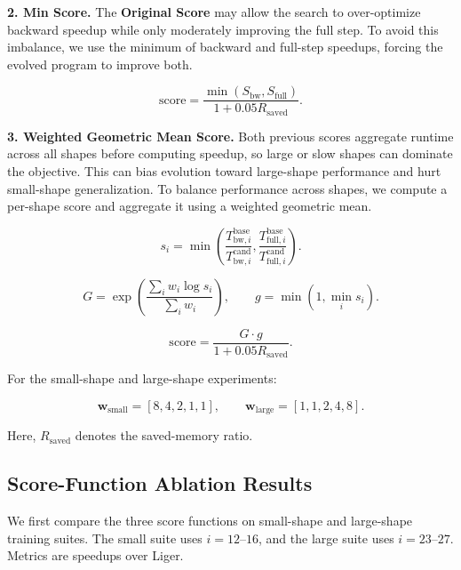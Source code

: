 \documentclass[11pt]{article}
\begin{document}
\vspace{1em}

\noindent
\textbf{2. Min Score.}
The \textbf{Original Score} may allow the search to over-optimize backward speedup while only moderately improving the full step. To avoid this imbalance, we use the minimum of backward and full-step speedups, forcing the evolved program to improve both.

\[
\mathrm{score}
=
\frac{
\min\left(S_{\mathrm{bw}}, S_{\mathrm{full}}\right)
}{
1 + 0.05 R_{\mathrm{saved}}
}.
\]

\vspace{1em}

\noindent
\textbf{3. Weighted Geometric Mean Score.}
Both previous scores aggregate runtime across all shapes before computing speedup, so large or slow shapes can dominate the objective. This can bias evolution toward large-shape performance and hurt small-shape generalization. To balance performance across shapes, we compute a per-shape score and aggregate it using a weighted geometric mean.

\[
s_i
=
\min\left(
\frac{
T^{\mathrm{base}}_{\mathrm{bw}, i}
}{
T^{\mathrm{cand}}_{\mathrm{bw}, i}
},
\frac{
T^{\mathrm{base}}_{\mathrm{full}, i}
}{
T^{\mathrm{cand}}_{\mathrm{full}, i}
}
\right).
\]

\[
G
=
\exp\left(
\frac{
\sum_i w_i \log s_i
}{
\sum_i w_i
}
\right),
\qquad
g
=
\min\left(1, \min_i s_i\right).
\]

\[
\mathrm{score}
=
\frac{
G \cdot g
}{
1 + 0.05 R_{\mathrm{saved}}
}.
\]

\vspace{1em}

\noindent
For the small-shape and large-shape experiments:

\[
\bm{w}_{\mathrm{small}}
=
[8, 4, 2, 1, 1],
\qquad
\bm{w}_{\mathrm{large}}
=
[1, 1, 2, 4, 8].
\]

\vspace{1em}

\noindent
Here, \(R_{\mathrm{saved}}\) denotes the saved-memory ratio.

\subsection{Score-Function Ablation Results}

\noindent
We first compare the three score functions on small-shape and large-shape training suites. The small suite uses \(i=12\text{--}16\), and the large suite uses \(i=23\text{--}27\). Metrics are speedups over Liger.
\end{document}
